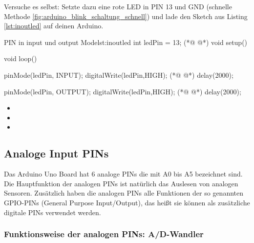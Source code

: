 Versuche es selbst: Setzte dazu eine rote LED in PIN 13 und GND (schnelle Methode \ref{fig:arduino_blink_schaltung_schnell}) und lade den Sketch aus Listing \ref{lst:inoutled} auf deinen Arduino.  
\begin{multicols}{2}
\begin{arduinoCode}{PIN in input und output Mode}{lst:inoutled}
int ledPin = 13; (*@  @*)
void setup() {  
}

void loop() {
  pinMode(ledPin, INPUT);
  digitalWrite(ledPin,HIGH); (*@  @*)
  delay(2000);
  
  pinMode(ledPin, OUTPUT);
  digitalWrite(ledPin,HIGH); (*@  @*)
  delay(2000);   
}
\end{arduinoCode}
\vfill
\columnbreak

\null\vfill
\begin{itemize}
  \itemsep15pt
  \item[] 
  \item[] 

  \item[] 
\end{itemize}
\vfill \null


\end{multicols}

\subsection{Analoge Input PINs} 

Das Arduino Uno Board hat 6 analoge PINs die mit A0 bis A5 bezeichnet sind. Die Hauptfunktion der analogen PINs ist natürlich das Auslesen von analogen Sensoren. Zusätzlich haben die analogen PINs alle Funktionen der so genannten GPIO-PINs (General Purpose Input/Output), das heißt sie können als zusätzliche digitale PINs verwendet werden.

\subsubsection{Funktionsweise der analogen PINs: A/D-Wandler} 

